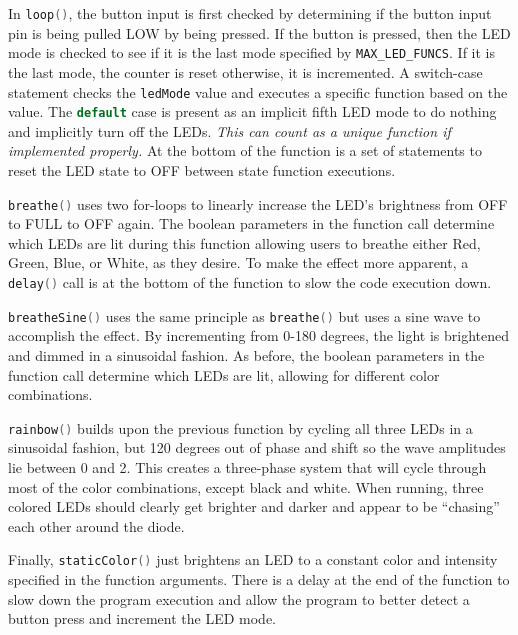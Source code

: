 \documentclass{article}
\begin{document}
    In \lstinline[language=C++, style=mystyle]{loop()}, the button input is first checked by determining if the button input pin is being pulled LOW by being pressed.
    If the button is pressed, then the LED mode is checked to see if it is the last mode specified by \lstinline[language=C++, style=mystyle]{MAX_LED_FUNCS}.
    If it is the last mode, the counter is reset otherwise, it is incremented.
    A switch-case statement checks the \lstinline[language=C++, style=mystyle]{ledMode} value and executes a specific function based on the value. The \lstinline[language=C++, style=mystyle]{default} case is present as an implicit fifth LED mode to do nothing and implicitly turn off the LEDs. 
    \emph{This can count as a unique function if implemented properly.}
    At the bottom of the function is a set of statements to reset the LED state to OFF between state function executions.
    
    \lstinline[language=C++, style=mystyle]{breathe()} uses two for-loops to linearly increase the LED's brightness from OFF to FULL to OFF again.
    The boolean parameters in the function call determine which LEDs are lit during this function allowing users to breathe either Red, Green, Blue, or White, as they desire.
    To make the effect more apparent, a \lstinline[language=C++, style=mystyle]{delay()} call is at the bottom of the function to slow the code execution down.

    \lstinline[language=C++, style=mystyle]{breatheSine()} uses the same principle as \lstinline[language=C++, style=mystyle]{breathe()} but uses a sine wave to accomplish the effect.
    By incrementing from 0-180 degrees, the light is brightened and dimmed in a sinusoidal fashion.
    As before, the boolean parameters in the function call determine which LEDs are lit, allowing for different color combinations.

    \lstinline[language=C++, style=mystyle]{rainbow()} builds upon the previous function by cycling all three LEDs in a sinusoidal fashion, but 120 degrees out of phase and shift so the wave amplitudes lie between 0 and 2.
    This creates a three-phase system that will cycle through most of the color combinations, except black and white.
    When running, three colored LEDs should clearly get brighter and darker and appear to be ``chasing'' each other around the diode.

    Finally, \lstinline[language=C++, style=mystyle]{staticColor()} just brightens an LED to a constant color and intensity specified in the function arguments.
    There is a delay at the end of the function to slow down the program execution and allow the program to better detect a button press and increment the LED mode.

    \pagebreak
    
\end{document}
